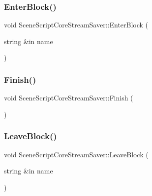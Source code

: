 \subsubsection{\texorpdfstring{Enter\+Block()}{EnterBlock()}}
{\footnotesize\ttfamily void Scene\+Script\+Core\+Stream\+Saver\+::\+Enter\+Block (\begin{DoxyParamCaption}\item[{string \&in}]{name }\end{DoxyParamCaption})}

\hypertarget{class_scene_script_core_stream_saver_ac97eb97a2d5c27119ddb838aa4a75baa}{}\label{class_scene_script_core_stream_saver_ac97eb97a2d5c27119ddb838aa4a75baa} 
\subsubsection{\texorpdfstring{Finish()}{Finish()}}
{\footnotesize\ttfamily void Scene\+Script\+Core\+Stream\+Saver\+::\+Finish (\begin{DoxyParamCaption}{ }\end{DoxyParamCaption})}

\hypertarget{class_scene_script_core_stream_saver_ad168bd91f05d9850da2e42c78e058bb7}{}\label{class_scene_script_core_stream_saver_ad168bd91f05d9850da2e42c78e058bb7} 
\subsubsection{\texorpdfstring{Leave\+Block()}{LeaveBlock()}}
{\footnotesize\ttfamily void Scene\+Script\+Core\+Stream\+Saver\+::\+Leave\+Block (\begin{DoxyParamCaption}\item[{string \&in}]{name }\end{DoxyParamCaption})}

\hypertarget{class_scene_script_core_stream_saver_a689a9b8b22dbc1b8edfcfee4511da455}{}\label{class_scene_script_core_stream_saver_a689a9b8b22dbc1b8edfcfee4511da455} 
